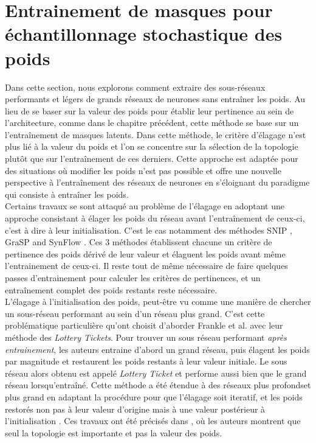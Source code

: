 \section*{Entrainement de masques pour échantillonnage stochastique des poids}

Dans cette section, nous explorons comment extraire des sous-réseaux performants
et légers de grands réseaux de neurones sans entraîner les poids. Au lieu de se
baser sur la valeur des poids pour établir leur pertinence au sein de
l'architecture, comme dans le chapitre précédent, cette méthode se base sur un
l'entraînement de masques latents. Dans cette méthode, le critère d'élagage
n'est plus lié à la valeur du poids et l'on se concentre sur la sélection de la
topologie plutôt que sur l'entraînement de ces derniers. Cette approche est
adaptée pour des situations où modifier les poids n'est pas possible et offre
une nouvelle perspective à l'entraînement des réseaux de neurones en s'éloignant
du paradigme qui consiste à entraîner les poids.\\

Certains travaux se sont attaqué au problème de l'élagage en adoptant une
approche consistant à élager les poids du réseau avant l'entraînement de
ceux-ci, c'est à dire à leur initialisation. C'est le cas notamment des méthodes
SNIP \cite{DBLP:conf/iclr/LeeAT19}, GraSP \cite{DBLP:conf/iclr/WangZG20} and
SynFlow \cite{DBLP:conf/nips/TanakaKYG20}. Ces 3 méthodes établissent chacune un
critère de pertinence des poids dérivé de leur valeur et élaguent les poids
avant même l'entrainement de ceux-ci. Il reste tout de même nécessaire de faire
quelques passes d'entrainement pour calculer les critères de pertinences, et un
entraînement complet des poids restants reste nécessaire.\\

L'élagage à l'initialisation des poids, peut-être vu comme une manière de
chercher un sous-réseau performant au sein d'un réseau plus grand. C'est cette
problématique particulière qu'ont choisit d'aborder Frankle et al.
\cite{DBLP:conf/iclr/FrankleC19} avec leur méthode des \emph{Lottery Tickets}.
Pour trouver un sous réseau performant \emph{après entrainement}, les auteurs
entraine d'abord un grand réseau, puis élagent les poids par magnitude et
restaurent les poids restants à leur valeur initiale. Le sous réseau alors
obtenu est appelé \emph{Lottery Ticket} et performe aussi bien que le grand
réseau lorsqu'entraîné. Cette méthode a été étendue à des réseaux plus
profondset plus grand en adaptant la procédure pour que  l'élagage soit
iteratif, et les poids restorés non pas à leur valeur d'origine mais à une
valeur postérieur à l'initialisation \cite{DBLP:conf/icml/FrankleD0C20}. Ces
travaux ont été précisés dans \cite{DBLP:conf/iclr/LiuSZHD19}, où les auteurs
montrent que seul la topologie est importante et pas la valeur des poids.\\


